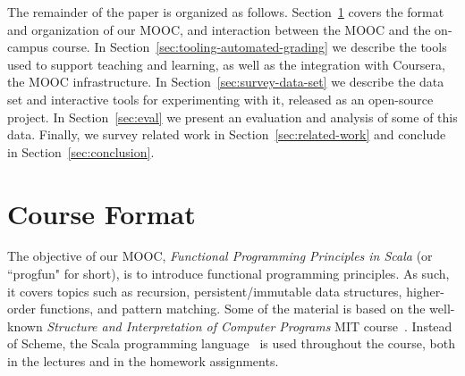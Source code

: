 \documentclass{sig-alternate}
\begin{document}



The remainder of the paper is organized as follows. Section~\ref{sec:course-format} covers the format and organization of our MOOC, and interaction between the MOOC and the on-campus course. In Section~\ref{sec:tooling-automated-grading} we describe the tools used to support teaching and learning, as well as the integration with Coursera, the MOOC infrastructure. In Section~\ref{sec:survey-data-set} we describe the data set and interactive tools for experimenting with it, released as an open-source project. In Section~\ref{sec:eval} we present an evaluation and analysis of some of this data. Finally, we survey related work in Section~\ref{sec:related-work} and conclude in Section~\ref{sec:conclusion}.


\section{Course Format}
\label{sec:course-format}

The objective of our MOOC, {\em Functional Programming Principles in Scala} (or ``progfun" for short),
is to introduce functional programming
principles. As such, it covers topics such as recursion, persistent/immutable data
structures, higher-order functions, and pattern matching. Some of the material
is based on the well-known {\em Structure and Interpretation of Computer
Programs} MIT course~\cite{Abelson85}. Instead of Scheme, the Scala
programming language~\cite{Odersky-Spoon-Venners07} is used throughout the
course, both in the lectures and in the homework assignments.
\end{document}
